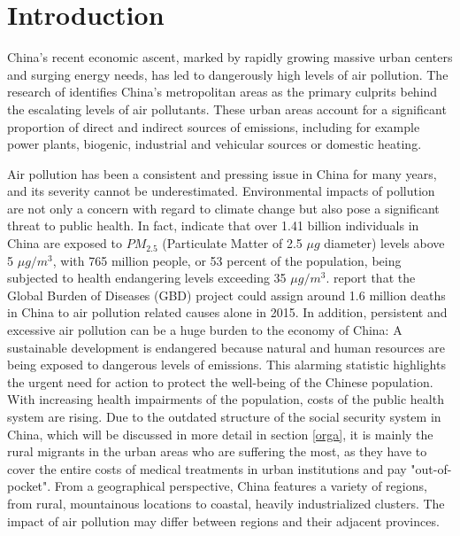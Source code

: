 \documentclass[
]{article}
\begin{document}
	\newpage

	\hypertarget{introduction}{%
		\section{Introduction}\label{introduction}}
	China's recent economic ascent, marked by rapidly growing massive urban centers and surging energy needs, has led to dangerously high levels of air pollution. The research of \cite{chan2008air} identifies China's metropolitan areas as the primary culprits behind the escalating levels of air pollutants. These urban areas account for a significant proportion of direct and indirect sources of emissions, including for example power plants, biogenic, industrial and vehicular sources or domestic heating.

	Air pollution has been a consistent and pressing issue in China for many years, and its severity cannot be underestimated. Environmental impacts of pollution are not only a concern with regard to climate change but also pose a significant threat to public health. In fact, \cite{maruyama2022air} indicate that over 1.41 billion individuals in China are exposed to $PM_{2.5}$ (Particulate Matter of  2.5 $\mu g$ diameter) levels above 5 $\mu g/m^3$, with 765 million people, or 53 percent of the population, being subjected to health endangering levels exceeding 35 $\mu g/m^3$.
	\cite{song_air_2017} report that the Global Burden of Diseases (GBD) project could assign around 1.6 million deaths in China to air pollution related causes alone in 2015. In addition, persistent and excessive air pollution can be a huge burden to the economy of China: A sustainable development is endangered because natural and human resources are being exposed to dangerous levels of  emissions. This alarming statistic highlights the urgent need for action to protect the well-being of the Chinese population. With increasing health impairments of the population, costs of the public health system are rising.
	Due to the outdated structure of the social security system in China, which will be discussed in more detail in section \ref{orga}, it is mainly the rural migrants in the urban areas who are suffering the most, as they have to cover the entire costs of medical treatments in urban institutions and pay "out-of-pocket".
	From a geographical perspective, China features a variety of regions, from rural, mountainous locations to coastal, heavily industrialized clusters. The impact of air pollution may differ between regions and their adjacent provinces.\\
\end{document}
